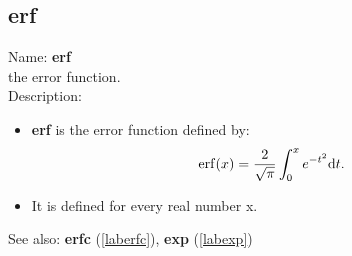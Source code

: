 \subsection{erf}
\label{laberf}
\noindent Name: \textbf{erf}\\
the error function.\\
\noindent Description: \begin{itemize}

\item \textbf{erf} is the error function defined by:
   $$\mathrm{erf}(x) = \frac{2}{\sqrt{\pi}} \int_0^x e^{-t^2} {\rm d}t.$$

\item It is defined for every real number x.
\end{itemize}
See also: \textbf{erfc} (\ref{laberfc}), \textbf{exp} (\ref{labexp})
